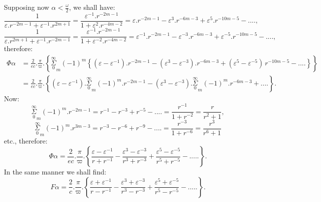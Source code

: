 \documentclass{article}
\begin{document}
Supposing now $\alpha<\frac{\omega}{2}$, we shall have:
\[
\frac{1}{\varepsilon.r^{-2m-1}+\varepsilon^{-1}.r^{2m+1}} = \frac{\varepsilon^{-1}.r^{-2m-1}}{1+\varepsilon^{2}.r^{-4m-2}} = \varepsilon.r^{-2m-1}-\varepsilon^{3}.r^{-6m-3}+\varepsilon^{5}.r^{-10m-5}-....,
\]
\[
\frac{1}{\varepsilon.r^{2m+1}+\varepsilon^{-1}.r^{-2m-1}} = \frac{\varepsilon^{-1}.r^{-2m-1}}{1+\varepsilon^{-2}.r^{-4m-2}} = \varepsilon^{-1}.r^{-2m-1}-\varepsilon^{-3}.r^{-6m-3}+\varepsilon^{-5}.r^{-10m-5}-....,
\]
therefore:
\[
\begin{aligned}
\Phi\alpha &= \frac{2}{ec}.\frac{\pi}{\varpi}.\left\{\overset{\infty}{\underset{0}{\Sigma}}_{m}(-1)^{m}\left\{(\varepsilon-\varepsilon^{-1}).r^{-2m-1}-(\varepsilon^{3}-\varepsilon^{-3}).r^{-6m-3}+(\varepsilon^{5}-\varepsilon^{-5})\,r^{-10m-5}-....\right\}\right\}\\
&= \frac{2}{ec}.\frac{\pi}{\varpi}.\left\{(\varepsilon-\varepsilon^{-1}).\overset{\infty}{\underset{0}{\Sigma}}_{m}(-1)^{m}.r^{-2m-1}-(\varepsilon^{3}-\varepsilon^{-3}).\overset{\infty}{\underset{0}{\Sigma}}_{m}(-1)^{m}.r^{-6m-3}+....\right\}.
\end{aligned}
\]
Now:
\[
\overset{\infty}{\underset{0}{\Sigma}}_{m}(-1)^{m}.r^{-2m-1} = r^{-1}-r^{-3}+r^{-5}-.... = \frac{r^{-1}}{1+r^{-2}} = \frac{r}{r^{2}+1},
\]
\[
\overset{\infty}{\underset{0}{\Sigma}}_{m}(-1)^{m}.r^{3m-3} = r^{-3}-r^{-6}+r^{-9}-.... = \frac{r^{-3}}{1+r^{-6}} = \frac{r^{3}}{r^{6}+1}
\]
etc., therefore:
\[
\Phi\alpha = \frac{2}{ec}.\frac{\pi}{\varpi}.\left\{\frac{\varepsilon-\varepsilon^{-1}}{r+r^{-1}}-\frac{\varepsilon^{3}-\varepsilon^{-3}}{r^{3}+r^{-3}}+\frac{\varepsilon^{5}-\varepsilon^{-5}}{r^{5}+r^{-5}}-.....\right\}.
\tag{204.}
\]
In the same manner we shall find:
\[
F\alpha = \frac{2}{c}.\frac{\pi}{\varpi}.\left\{\frac{\varepsilon+\varepsilon^{-1}}{r-r^{-1}}-\frac{\varepsilon^{3}+\varepsilon^{-3}}{r^{3}-r^{-3}}+\frac{\varepsilon^{5}+\varepsilon^{-5}}{r^{5}-r^{-5}}-.....\right\}.
\tag{205.}
\]
\end{document}
